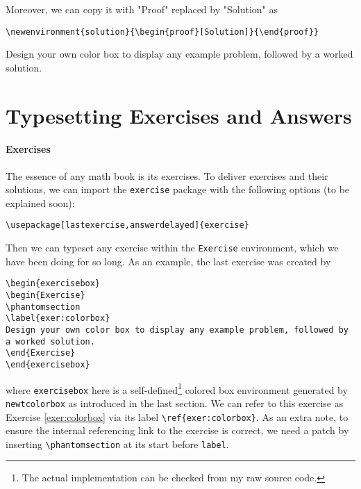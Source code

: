 Moreover, we can copy it with "Proof" replaced by "Solution" as 
\begin{lstlisting}
\newenvironment{solution}{\begin{proof}[Solution]}{\end{proof}}
\end{lstlisting}

\begin{exercisebox}
\begin{Exercise}
%
\label{exer:colorbox}%
Design your own color box to display any example problem, followed by a worked solution.
\end{Exercise}
\end{exercisebox}

\section{Typesetting Exercises and Answers}

\paragraph{Exercises}
The essence of any math book is its exercises. To deliver exercises and their solutions, we can import the \texttt{exercise} package with the following options (to be explained soon):
\begin{lstlisting}
\usepackage[lastexercise,answerdelayed]{exercise}
\end{lstlisting}
Then we can typeset any exercise within the \texttt{Exercise} environment, which we have been doing for so long. As an example, the last exercise was created by
\begin{lstlisting}
\begin{exercisebox}
\begin{Exercise}
\phantomsection
\label{exer:colorbox}
Design your own color box to display any example problem, followed by a worked solution.
\end{Exercise}
\end{exercisebox}
\end{lstlisting}
where \texttt{exercisebox} here is a self-defined\footnote{The actual implementation can be checked from my raw source code.} colored box environment generated by \texttt{newtcolorbox} as introduced in the last section. We can refer to this exercise as Exercise \ref{exer:colorbox} via its label \texttt{\textbackslash ref\{exer:colorbox\}}. As an extra note, to ensure the internal referencing link to the exercise is correct, we need a patch by inserting \texttt{\textbackslash phantomsection} at its start before \texttt{label}.

